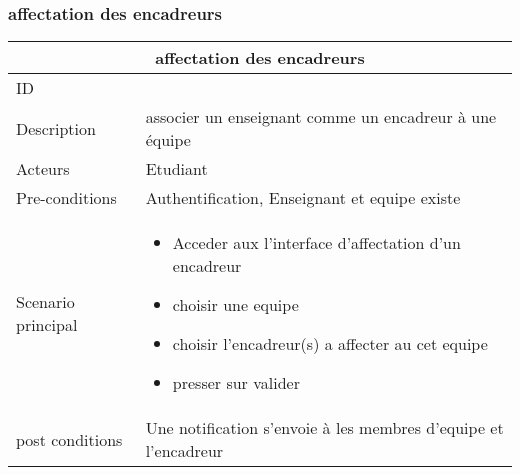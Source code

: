 \documentclass[11pt,fleqn]{book} %
\begin{document}
\subsubsection{affectation des encadreurs}
\begin{center}
\begin{tabularx}{1\textwidth} { | p{4cm} | >{\raggedright\arraybackslash}X |  }
  \hline
  \multicolumn{2}{|c|}{affectation des encadreurs} \\
 \hline
 ID & 6  \\
 \hline
 Description  & associer un enseignant comme un encadreur à une équipe \\
  \hline
 Acteurs  & Etudiant   \\
  \hline
 Pre-conditions  & Authentification, Enseignant et equipe existe\\
 \hline
 Scenario principal  &  
 \begin{itemize}
     \item Acceder aux l'interface d'affectation d'un encadreur
     \item choisir une equipe 
     \item choisir l'encadreur(s) a affecter au cet equipe
     \item presser sur valider 

 \end{itemize}\\
  \hline
 post conditions  &  Une notification s’envoie à les membres d'equipe et l'encadreur \\
  \hline
\end{tabularx}
\label{tbl:nicetablelesstable}
\end{center}
\end{document}
